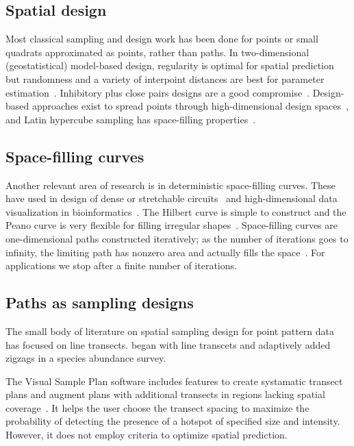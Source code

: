 \documentclass[review]{elsarticle}
\begin{document}
\subsection{Spatial design}

Most classical sampling and design work has been done for points or small
quadrats approximated as points, rather than paths. In two-dimensional
(geostatistical) model-based design, regularity is optimal for spatial
prediction but randomness and a variety of interpoint distances are best for
parameter estimation~\citep{diggle}. Inhibitory plus close pairs designs are a
good compromise~\citep{chipetaetal2017}. Design-based approaches exist to
spread points through high-dimensional design spaces~\citep{borkowskipiepel},
and Latin hypercube sampling has space-filling
properties~\citep{mckayetal,husslageetal}.


\subsection{Space-filling curves}

Another relevant area of research is in deterministic space-filling curves.
These have used in design of dense or stretchable
circuits~\citep{ogorzalek,mazhang} and high-dimensional data visualization
in bioinformatics~\citep{hilbertvis}. The Hilbert curve is simple to construct
and the Peano curve is very flexible for filling irregular
shapes~\citep{fanetal}. Space-filling curves are one-dimensional paths
constructed iteratively; as the number of iterations goes to infinity, the
limiting path has nonzero area and actually fills the space~\citep{sagan}. For
applications we stop after a finite number of iterations.


\subsection{Paths as sampling designs}

The small body of literature on spatial sampling design for point pattern
data has focused on line transects. \citet{pollard} began with line transcets
and adaptively added zigzags in a species abundance survey.

The Visual Sample Plan software includes features to create systamatic transect
plans and augment plans with additional transects in regions lacking spatial
coverage~\citep{vspguide}. It helps the user choose the transect spacing to
maximize the probability of detecting the presence of a hotspot of specified
size and intensity. However, it does not employ criteria to optimize spatial
prediction.
\end{document}
